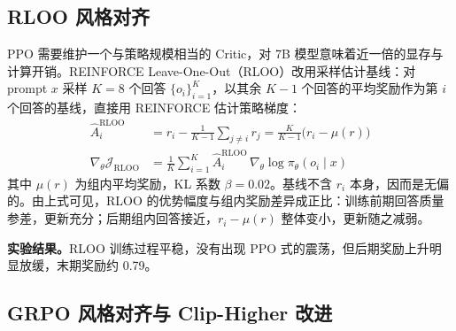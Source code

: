 \documentclass[fontset=fandol,type=master,campus=shenzhen,etitleauto=true]{hithesisbook}
\begin{document}
\subsection{RLOO 风格对齐}\label{rloo-style-align}

PPO 需要维护一个与策略规模相当的 Critic，对 7B 模型意味着近一倍的显存与计算开销。REINFORCE Leave-One-Out（RLOO）\cite{ref88}改用采样估计基线：对 prompt $x$ 采样 $K = 8$ 个回答 $\{o_i\}_{i=1}^{K}$，以其余 $K - 1$ 个回答的平均奖励作为第 $i$ 个回答的基线，直接用 REINFORCE 估计策略梯度：
\begin{equation}\label{eq:rloo}
\begin{aligned}
\hat{A}_i^{\text{RLOO}} &= r_i - \frac{1}{K - 1} \sum_{j \ne i} r_j = \frac{K}{K - 1}\bigl(r_i - \mu(r)\bigr) \\
\nabla_\theta \mathcal{J}_{\text{RLOO}} &= \frac{1}{K} \sum_{i=1}^{K} \hat{A}_i^{\text{RLOO}}\, \nabla_\theta \log \pi_\theta(o_i \mid x)
\end{aligned}
\end{equation}
其中 $\mu(r)$ 为组内平均奖励，KL 系数 $\beta = 0.02$。基线不含 $r_i$ 本身，因而是无偏的。由上式可见，RLOO 的优势幅度与组内奖励差异成正比：训练前期回答质量参差，更新充分；后期组内回答接近，$r_i - \mu(r)$ 整体变小，更新随之减弱。

\textbf{实验结果。}RLOO 训练过程平稳，没有出现 PPO 式的震荡，但后期奖励上升明显放缓，末期奖励约 0.79。

\subsection{GRPO 风格对齐与 Clip-Higher 改进}\label{grpo-ux98ceux683cux5bf9ux9f50ux4e0e-clip-higher-ux6539ux8fdb}
\end{document}
